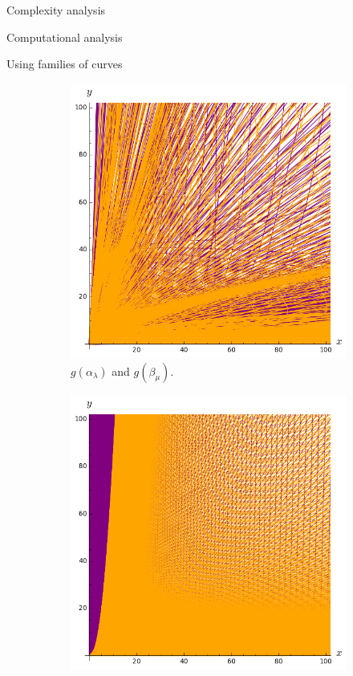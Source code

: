 \documentclass[11pt, a4paper, english, twoside, notitlepage, openright]{report}
\begin{document}
\begin{chapter}{Complexity analysis}
\begin{section}{Computational analysis}
\begin{subsection}{Using families of curves}
\begin{figure}
\vspace{-0.6cm}
\hspace{0.4cm}
\begin{subfigure}{.45\linewidth}\centering
\includegraphics[width=1\textwidth]{plots/ch5_25_1curves3.png}
\vspace{-0.4cm}\caption{$g(\alpha_{\lambda})$ and $g(\beta_{\mu})$.\label{fig:1curves1}}
\end{subfigure}
\begin{subfigure}{.45\linewidth}\centering
\includegraphics[width=1\textwidth]{plots/ch5_29_3curves3.png}

\end{subfigure}
\end{figure}
\end{subsection}
\end{section}
\end{chapter}
\end{document}
